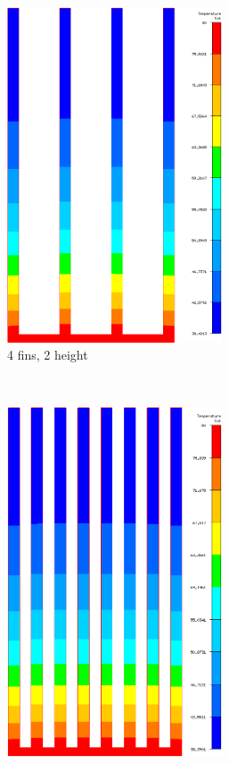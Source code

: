\begin{figure}[h]
\begin{subfigure}[t] {0.23\textwidth}
 \centering
 \includegraphics[width=0.7\textwidth]{../figures/heatsink4_h205_gmf005.png}
 \caption{4 fins, 2 height}
 \label{fig:mesh_temps_res_4_2}
 \end{subfigure}
 ~
 \begin{subfigure}[t] {0.23\textwidth}
 \centering
 \includegraphics[width=0.7\textwidth]{../figures/heatsink8_h205_gmf005.png}

\end{subfigure}
\end{figure}
